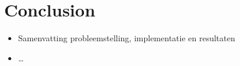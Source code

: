 \chapter{Conclusion}

\begin{itemize}
\item Samenvatting probleemstelling, implementatie en resultaten
\item \ldots
\end{itemize}
